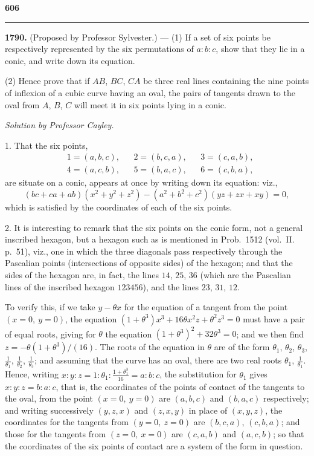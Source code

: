 \documentclass[12pt,a4paper]{article}
\theoremstyle{plain}
\begin{document}
\newpage
\noindent\textbf{606}

\noindent\rule{\textwidth}{0.4pt}
\vspace{0.3cm}

\noindent[Vol.~IV. pp.~81--83.]

\vspace{0.3cm}
\noindent\textbf{1790.} (Proposed by Professor Sylvester.) --- (1) If a set of six points be respectively represented by the six permutations of $a:b:c$, show that they lie in a conic, and write down its equation.

(2) Hence prove that if $AB$, $BC$, $CA$ be three real lines containing the nine points of inflexion of a cubic curve having an oval, the pairs of tangents drawn to the oval from $A$, $B$, $C$ will meet it in six points lying in a conic.

\textit{Solution by Professor Cayley.}

1. That the six points,
\begin{align*}
&1=(a,b,c),&&2=(b,c,a),&&3=(c,a,b),\\
&4=(a,c,b),&&5=(b,a,c),&&6=(c,b,a),
\end{align*}
are situate on a conic, appears at once by writing down its equation: viz.,
\[(bc+ca+ab)(x^2+y^2+z^2) - (a^2+b^2+c^2)(yz+zx+xy) = 0,\]
which is satisfied by the coordinates of each of the six points.

2. It is interesting to remark that the six points on the conic form, not a general inscribed hexagon, but a hexagon such as is mentioned in Prob.~1512 (vol.~II. p.~51), viz., one in which the three diagonals pass respectively through the Pascalian points (intersections of opposite sides) of the hexagon; and that the sides of the hexagon are, in fact, the lines $14$, $25$, $36$ (which are the Pascalian lines of the inscribed hexagon $123456$), and the lines $23$, $31$, $12$.

To verify this, if we take $y-\theta x$ for the equation of a tangent from the point $(x=0,\ y=0)$, the equation $(1+\theta^3)x^3 + 16\theta x^2 z + \theta^2 z^3 = 0$ must have a pair of equal roots, giving for $\theta$ the equation $(1+\theta^3)^2 + 32\theta^3 = 0$; and we then find $z = -\theta(1+\theta^3)/(16)$. The roots of the equation in $\theta$ are of the form $\theta_1$, $\theta_2$, $\theta_3$, $\frac{1}{\theta_1}$, $\frac{1}{\theta_2}$, $\frac{1}{\theta_3}$; and assuming that the curve has an oval, there are two real roots $\theta_1$, $\frac{1}{\theta_1}$. Hence, writing $x:y:z = 1:\theta_1:\frac{1+\theta_1^3}{16} = a:b:c$, the substitution for $\theta_1$ gives $x:y:z = b:a:c$, that is, the coordinates of the points of contact of the tangents to the oval, from the point $(x=0,\ y=0)$ are $(a,b,c)$ and $(b,a,c)$ respectively; and writing successively $(y,z,x)$ and $(z,x,y)$ in place of $(x,y,z)$, the coordinates for the tangents from $(y=0,\ z=0)$ are $(b,c,a)$, $(c,b,a)$; and those for the tangents from $(z=0,\ x=0)$ are $(c,a,b)$ and $(a,c,b)$; so that the coordinates of the six points of contact are a system of the form in question.
\end{document}
